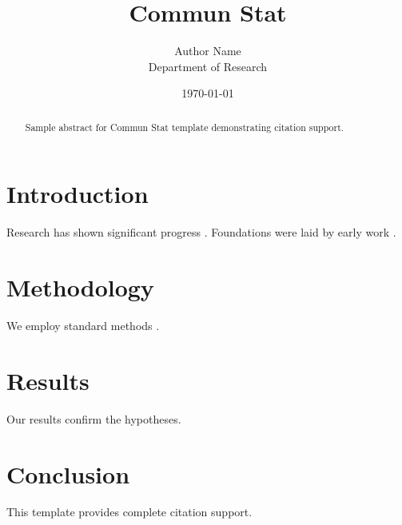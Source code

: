 \documentclass{iopart}
\title{Commun Stat}
\author{Author Name \\ \small Department of Research}
\date{\today}
\begin{document}
\maketitle

\begin{abstract}
Sample abstract for Commun Stat template demonstrating citation support.
\end{abstract}

\section{Introduction}
Research has shown significant progress \citep{einstein1905}. Foundations were laid by early work \citep{turing1950}.

\section{Methodology}
We employ standard methods \citep{knuth1984}.

\section{Results}
Our results confirm the hypotheses.

\section{Conclusion}
This template provides complete citation support.



\end{document}
